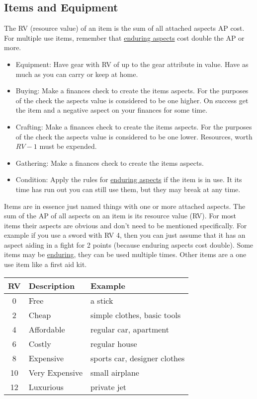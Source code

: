 \documentclass[11pt]{article}
\begin{document}
{\subsection{Items and Equipment}
\label{sec:org6fabd7b}
\begin{short}
The RV (resource value) of an item is the sum of all attached aspects AP cost. For multiple use items, remember that \hyperref[sec:org113a79a]{enduring aspects} cost double the AP or more.
\begin{itemize}
\item Equipment: Have gear with RV of up to the gear attribute in value. Have as much as you can carry or keep at home.
\item Buying: Make a finances check to create the items aspects. For the purposes of the check the aspects value is considered to be one higher. On success get the item and a negative aspect  on your finances for some time.
\item Crafting: Make a finances check to create the items aspects. For the purposes of the check the aspects value is considered to be one lower. Resources, worth \(RV-1\) must be expended.
\item Gathering: Make a finances check to create the items aspects.
\item Condition: Apply the rules for \hyperref[sec:org113a79a]{enduring aspects} if the item is in use. It its time has run out you can still use them, but they may break at any time.
\end{itemize}
\end{short}

Items are in essence just named things with one or more attached aspects. The sum of the AP of all aspects on an item is its resource value (RV). For most items their aspects are obvious and don't need to be mentioned specifically. For example if you use a sword with RV 4, then you can just assume that it has an aspect aiding in a fight for 2 points (because enduring aspects cost double). Some items may be \hyperref[sec:org113a79a]{enduring}, they can be used multiple times. Other items are a one use item like a first aid kit. 

\begin{center}
\begin{tabular}{c|l|l}
\textbf{RV} & \textbf{Description} & \textbf{Example}\\
\hline
0 & Free & a stick\\
2 & Cheap & simple clothes, basic tools\\
4 & Affordable & regular car, apartment\\
6 & Costly & regular house\\
8 & Expensive & sports car, designer clothes\\
10 & Very Expensive & small airplane\\
12 & Luxurious & private jet\\
\end{tabular}
\end{center}
}
\end{document}
